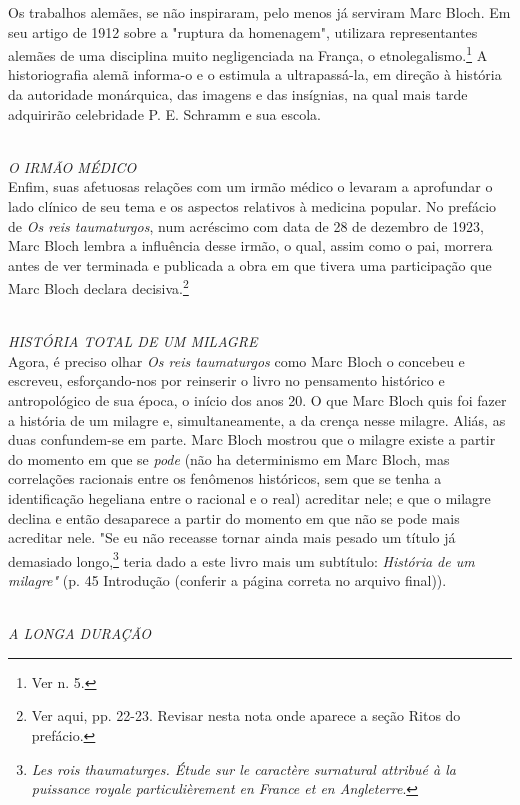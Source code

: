 \documentclass[a5paper]{book}
\begin{document}
Os trabalhos alemães, se não inspiraram, pelo menos já serviram Marc Bloch. Em seu artigo de 1912 sobre a "ruptura da homenagem", utilizara representantes alemães de uma disciplina muito negligenciada na França, o etnolegalismo.\footnote{Ver n. 5.} A historiografia alemã informa-o e o estimula a ultrapassá-la, em direção à história da autoridade monárquica, das imagens e das insígnias, na qual mais tarde adquirirão celebridade P. E. Schramm e sua escola.

~\\ \large \textit{O IRMÃO MÉDICO} ~\\

Enfim, suas afetuosas relações com um irmão médico o levaram a aprofundar o lado clínico de seu tema e os aspectos relativos à medicina popular. No prefácio de \textit{Os reis taumaturgos}, num acréscimo com data de 28 de dezembro de 1923, Marc Bloch lembra a influência desse irmão, o qual, assim como o pai, morrera antes de ver terminada e publicada a obra em que tivera uma participação que Marc Bloch declara decisiva.\footnote{Ver aqui, pp. 22-23. Revisar nesta nota onde aparece a seção Ritos do prefácio.}

~\\ \large \textit{HISTÓRIA TOTAL DE UM MILAGRE} ~\\

Agora, é preciso olhar \textit{Os reis taumaturgos} como Marc Bloch o concebeu e escreveu, esforçando-nos por reinserir o livro no pensamento histórico e antropológico de sua época, o início dos anos 20.
O que Marc Bloch quis foi fazer a história de um milagre e, simultaneamente, a da crença nesse milagre. Aliás, as duas confundem-se em parte. Marc Bloch mostrou que o milagre existe a partir do momento em que se \textit{pode} (não ha determinismo em Marc Bloch, mas correlações racionais entre os fenômenos históricos, sem que se tenha a identificação hegeliana entre o racional e o real) acreditar nele; e que o milagre declina e então desaparece a partir do momento em que não se pode mais acreditar nele. "Se eu não receasse tornar ainda mais pesado um título já demasiado longo,\footnote{\textit{Les rois thaumaturges. Étude sur le caractère surnatural attribué à la puissance royale particulièrement en France et en Angleterre}.} teria dado a este livro mais um subtítulo: \textit{História de um milagre"} (p. 45 Introdução (conferir a página correta no arquivo final)).

~\\ \large \textit{A LONGA DURAÇÃO} ~\\
\end{document}
